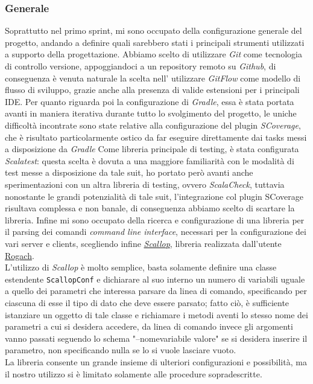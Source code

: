 \subsubsection{\textbf{Generale}}
Soprattutto nel primo sprint, mi sono occupato della configurazione generale del progetto, andando a definire quali sarebbero stati i principali strumenti utilizzati a supporto della progettazione.
Abbiamo scelto di utilizzare \textit{Git} come tecnologia di controllo versione, appoggiandoci a un repository remoto su \textit{Github}, di conseguenza è venuta naturale la scelta nell' utilizzare \textit{GitFlow} come modello di flusso di sviluppo, grazie anche alla presenza di valide estensioni per i principali IDE.
Per quanto riguarda poi la configurazione di \textit{Gradle}, essa è stata portata avanti in maniera iterativa durante tutto lo svolgimento del progetto, le uniche difficoltà incontrate sono state relative alla configurazione del plugin \textit{SCoverage}, che è risultato particolarmente ostico da far eseguire direttamente dai tasks messi a disposizione da \textit{Gradle}
Come libreria principale di testing, è stata configurata \textit{Scalatest}: questa scelta è dovuta a una maggiore familiarità con le modalità di test messe a disposizione da tale suit, ho portato però avanti anche sperimentazioni con un altra libreria di testing, ovvero \textit{ScalaCheck}, tuttavia nonostante le grandi potenzialità di tale suit, l'integrazione col plugin SCoverage risultava complessa e non banale, di conseguenza abbiamo scelto di scartare la libreria.
Infine mi sono occupato della ricerca e configurazione di una libreria per il parsing dei comandi \textit{command line interface}, necessari per la configurazione dei vari server e clients, scegliendo infine \href{https://github.com/scallop/scallop}{\textit{Scallop}}, libreria realizzata dall'utente \href{https://github.com/Rogach}{Rogach}.\\
L'utilizzo di \textit{Scallop} è molto semplice, basta solamente definire una classe estendente \texttt{ScallopConf} e dichiarare al suo interno un numero di variabili uguale a quello dei parametri che interessa parsare da linea di comando, specificando per ciascuna di esse il tipo di dato che deve essere parsato; fatto ciò, è sufficiente istanziare un oggetto di tale classe e richiamare i metodi aventi lo stesso nome dei parametri a cui si desidera accedere, da linea di comando invece gli argomenti vanno passati seguendo lo schema "--nomevariabile valore" se si desidera inserire il parametro, non specificando nulla se lo si vuole lasciare vuoto.\\
La libreria consente un grande insieme di ulteriori configurazioni e possibilità, ma il nostro utilizzo si è limitato solamente alle procedure sopradescritte.

